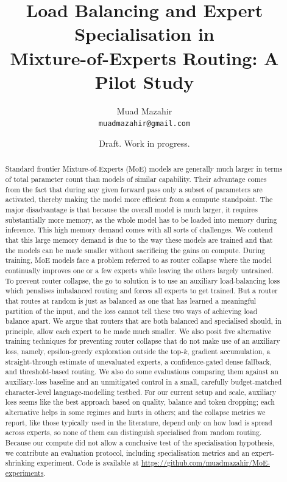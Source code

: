 \documentclass[10pt]{article}
\title{\textbf{Load Balancing and Expert Specialisation in\\ Mixture-of-Experts Routing: A Pilot Study}}
\author{
  Muad Mazahir\\
  \texttt{muadmazahir@gmail.com}
}
\date{Draft. Work in progress.}
\theoremstyle{definition}
\theoremstyle{remark}
\begin{document}
\maketitle

\begin{abstract}
Standard frontier Mixture-of-Experts (MoE) models are generally much larger in terms of total parameter count than models of similar capability. Their advantage comes from the fact that during any given forward pass only a subset of parameters are activated, thereby making the model more efficient from a compute standpoint. The major disadvantage is that because the overall model is much larger, it requires substantially more memory, as the whole model has to be loaded into memory during inference. This high memory demand comes with all sorts of challenges. We contend that this large memory demand is due to the way these models are trained and that the models can be made smaller without sacrificing the gains on compute. During training, MoE models face a problem referred to as router collapse where the model continually improves one or a few experts while leaving the others largely untrained. To prevent router collapse, the go to solution is to use an auxiliary load-balancing loss which penalises imbalanced routing and forces all experts to get trained. But a router that routes at random is just as balanced as one that has learned a meaningful partition of the input, and the loss cannot tell these two ways of achieving load balance apart. We argue that routers that are both balanced and specialised should, in principle, allow each expert to be made much smaller. We also posit five alternative training techniques for preventing router collapse that do not make use of an auxiliary loss, namely, epsilon-greedy exploration outside the top-$k$, gradient accumulation, a straight-through estimate of unevaluated experts, a confidence-gated dense fallback, and threshold-based routing. We also do some evaluations comparing them against an auxiliary-loss baseline and an unmitigated control in a small, carefully budget-matched character-level language-modelling testbed. For our current setup and scale, auxiliary loss seems like the best approach based on quality, balance and token dropping; each alternative helps in some regimes and hurts in others; and the collapse metrics we report, like those typically used in the literature, depend only on how load is spread across experts, so none of them can distinguish specialised from random routing. Because our compute did not allow a conclusive test of the specialisation hypothesis, we contribute an evaluation protocol, including specialisation metrics and an expert-shrinking experiment. Code is available at \url{https://github.com/muadmazahir/MoE-experiments}.
\end{abstract}
\end{document}
